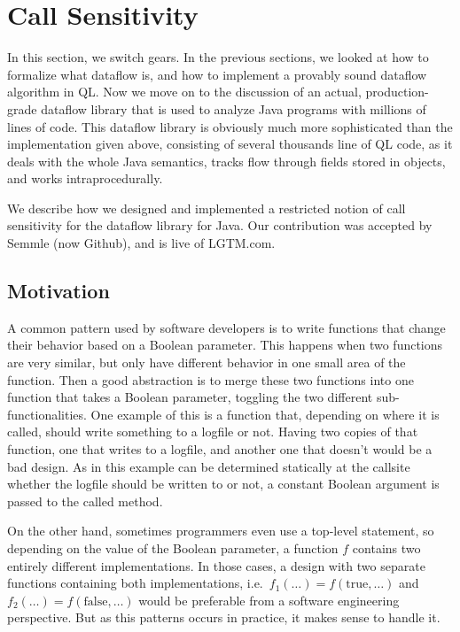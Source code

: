 \section{Call Sensitivity}
In this section, we switch gears.
In the previous sections, we looked at how to formalize what dataflow is, and how 
to implement a provably sound dataflow algorithm in QL.
Now we move on to the discussion of an actual, production-grade dataflow library
that is used to analyze Java programs with millions of lines of code.
This dataflow library is obviously much more sophisticated than the implementation given above,
consisting of several thousands line of QL code,
as it deals with the whole Java semantics, tracks flow through fields stored in 
objects, and works intraprocedurally.

We describe how we designed and implemented a restricted notion of call sensitivity
for the dataflow library for Java.
Our contribution was accepted by Semmle (now Github), and is live of LGTM.com.
\label{sec:call-sens}
\subsection{Motivation}
A common pattern used by software developers is to 
write functions that change their behavior based on 
a Boolean parameter.
This happens when two functions are very similar, but only have different behavior
in one small area of the function.
Then a good abstraction is to merge these two functions into one function that takes 
a Boolean parameter, toggling the two different sub-functionalities.
One example of this is a function that, depending on where it is called,
should write something to a logfile or not.
Having two copies of that function, one that writes to a logfile, and another one 
that doesn't would be a bad design.
As in this example can be determined statically at the callsite whether the logfile
should be written to or not, a constant Boolean argument is passed to the called method.

On the other hand, sometimes programmers even use a top-level
 statement, so depending on the
value of the Boolean parameter, a function $f$ contains two entirely different implementations.
In those cases, a design with two separate functions containing both implementations,
i.e.\ $f_1(\ldots) = f(\text{true}, \ldots)$ and $f_2(\ldots) = f(\text{false}, \ldots)$
would be preferable from a software engineering perspective. But as this patterns
occurs in practice, it makes sense to handle it.

